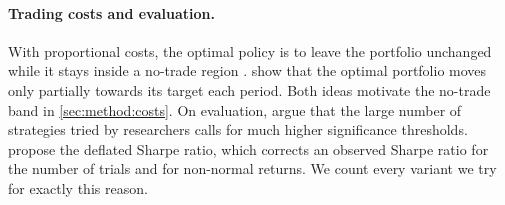 \paragraph{Trading costs and evaluation.}
With proportional costs, the optimal policy is to leave the portfolio unchanged while it stays
inside a no-trade region \citep{davis1990}. \citet{garleanu2013} show that the optimal portfolio
moves only partially towards its target each period. Both ideas motivate the no-trade band in
\cref{sec:method:costs}. On evaluation, \citet{harvey2016} argue that the large number of
strategies tried by researchers calls for much higher significance thresholds. \citet{bailey2014}
propose the deflated Sharpe ratio, which corrects an observed Sharpe ratio for the number of
trials and for non-normal returns. We count every variant we try for exactly this reason.
